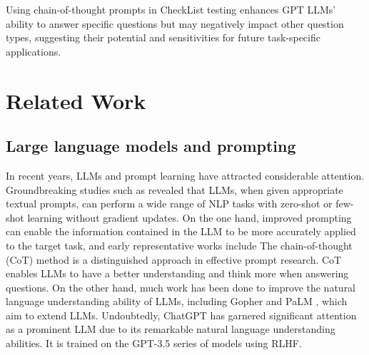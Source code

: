 \documentclass[runningheads]{llncs}
\begin{document}
Using chain-of-thought prompts in CheckList testing enhances GPT LLMs' ability to answer specific questions but may negatively impact other question types, suggesting their potential and sensitivities for future task-specific applications.

\section{Related Work}
\subsection{Large language models and prompting}
In recent years, LLMs and prompt learning have attracted considerable attention. Groundbreaking studies such as \cite{petroni2019language,jiang2020can,brown2020language} revealed that LLMs, when given appropriate textual prompts, can perform a wide range of NLP tasks with zero-shot or few-shot learning without gradient updates.
On the one hand, improved prompting can enable the information contained in the LLM to be more accurately applied to the target task, and early representative works include \cite{reynolds2021prompt,qin2021learning}
The chain-of-thought (CoT) \cite{wei2022chain} method is a distinguished approach in effective prompt research. 
CoT enables LLMs to have a better understanding and think more when answering questions. 
On the other hand, much work has been done to improve the natural language understanding ability of LLMs, including Gopher \cite{Rae2021scaling} and PaLM \cite{chowdhery2022palm}, which aim to extend LLMs. 
Undoubtedly, ChatGPT has garnered significant attention as a prominent LLM due to its remarkable natural language understanding abilities. It is trained on the GPT-3.5 series of models \cite{fu2022does} using RLHF. 
\end{document}
